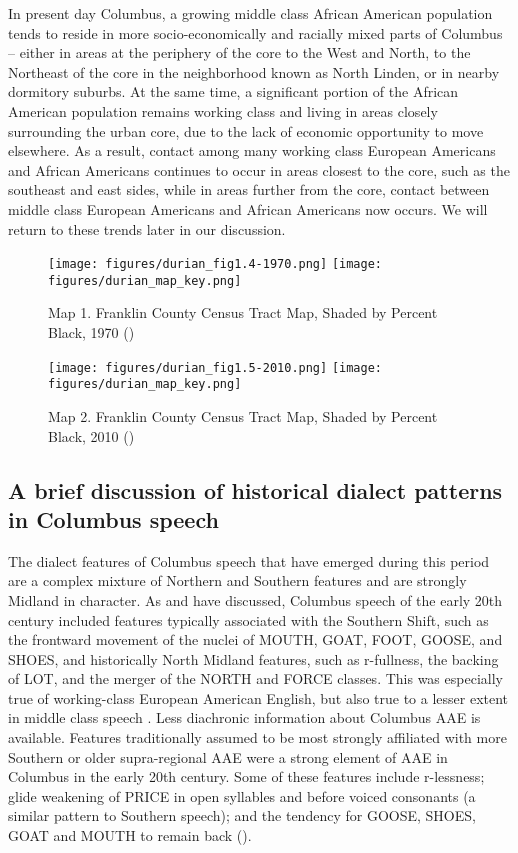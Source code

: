 \documentclass[output=paper,colorlinks,citecolor=brown]{langscibook}
\begin{document}
In present day Columbus, a growing middle class African American population tends to reside in more socio-economically and racially mixed parts of Columbus -- either in areas at the periphery of the core to the West and North, to the Northeast of the core in the neighborhood known as North Linden, or in nearby dormitory suburbs. At the same time, a significant portion of the African American population remains working class and living in areas closely surrounding the urban core, due to the lack of economic opportunity to move elsewhere. As a result, contact among many working class European Americans and African Americans continues to occur in areas closest to the core, such as the southeast and east sides, while in areas further from the core, contact between middle class European Americans and African Americans now occurs. We will return to these trends later in our discussion.

\begin{figure}
\texttt{[image: figures/durian\_fig1.4-1970.png]}%
\texttt{[image: figures/durian\_map\_key.png]}
\caption{Map 1. Franklin County Census Tract Map, Shaded by Percent Black, 1970 (\citealt{reecelindsjo2012})}
\label{fig:durian:4}
 \end{figure}


\begin{figure}
\texttt{[image: figures/durian\_fig1.5-2010.png]}
\texttt{[image: figures/durian\_map\_key.png]}
\caption{Map 2. Franklin County Census Tract Map, Shaded by Percent Black, 2010 (\citealt{reecelindsjo2012})}
\label{fig:durian:5}
 \end{figure}

\subsection{A brief discussion of historical dialect patterns in Columbus speech }

The dialect features of Columbus speech that have emerged during this period are a complex mixture of Northern and Southern features and are strongly Midland in character. As \citet{Thomas2001acoustic} and \citet{durian2012new} have discussed, Columbus speech of the early 20th century included features typically associated with the Southern Shift, such as the frontward movement of the nuclei of MOUTH, GOAT, FOOT, GOOSE, and SHOES, and historically North Midland features, such as r-fullness, the backing of LOT, and the merger of the NORTH and FORCE classes. This was especially true of working-class European American English, but also true to a lesser extent in middle class speech \citep{durian2012new}.  Less diachronic information about Columbus AAE is available. Features traditionally assumed to be most strongly affiliated with more Southern or older supra-regional AAE were a strong element of AAE in Columbus in the early 20th century.  Some of these features include r-lessness; glide weakening of PRICE in open syllables and before voiced consonants (a similar pattern to Southern speech); and the tendency for GOOSE, SHOES, GOAT and MOUTH to remain back (\citealt{Thomas1989vowel}).
\end{document}
